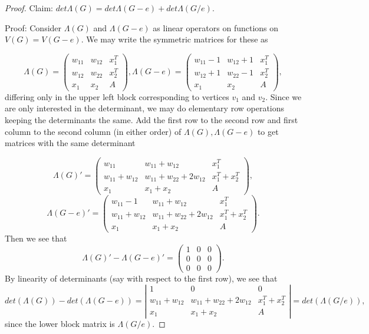 \documentclass{amsart}
\theoremstyle{definition}
\theoremstyle{remark}
\begin{document}
\begin{proof}
Claim:  $det \Lambda(G)=det \Lambda(G-e) + det \Lambda (G/e)$. 

Proof: Consider $\Lambda(G)$ and $\Lambda(G-e)$ as linear operators on functions on $V(G)=V(G-e)$. We may write the symmetric matrices for these as 

$$\Lambda(G)= \left(\begin{array}{ccc} w_{11} & w_{12} & x_1^T \\ w_{12} & w_{22} & x_2^T \\x_1 & x_2 &  A\end{array}\right) ,   \Lambda(G-e) =  \left(\begin{array}{ccc} w_{11}-1 & w_{12}+1 & x_1^T \\ w_{12}+1 & w_{22}-1 & x_2^T \\x_1 & x_2 &A  \end{array}\right) , $$
differing only in the upper left block corresponding to vertices $v_1$ and $v_2$. Since we are only interested in the determinant, we may do elementary row operations keeping the determinants the same. Add the first row to the second row and first column to the second column (in either order) of $\Lambda(G), \Lambda(G-e)$ to get matrices with the same determinant 

$$\Lambda(G)'= \left(\begin{array}{ccc} w_{11} & w_{11}+w_{12} & x_1^T \\w_{11}+w_{12} & w_{11}+w_{22}+2w_{12} & x_1^T+ x_2^T \\x_1 & x_1+x_2 & A \end{array}\right) , $$  $$\Lambda(G-e)' =  \left(\begin{array}{ccc} w_{11}-1 & w_{11}+w_{12} & x_1^T \\ w_{11}+w_{12} & w_{11}+w_{22}+2w_{12} & x_1^T+ x_2^T \\x_1 & x_1+x_2 & A \end{array}\right) .$$
Then we see that $$\Lambda(G)'-\Lambda(G-e)' = 
 \left(\begin{array}{ccc} 1 & 0 & 0 \\ 0 & 0 & 0 \\ 0 & 0 & 0 \end{array}\right).$$
 By linearity of determinants (say with respect to the first row), we see that 
 $$det(\Lambda(G))-det(\Lambda(G-e)) = \left|\begin{array}{ccc} 1 & 0 &  0 \\ w_{11}+w_{12} & w_{11}+w_{22}+2w_{12} & x_1^T+ x_2^T \\ x_1 & x_1+x_2 & A \end{array}\right| = det (\Lambda(G/e)),$$
since the lower block matrix is $\Lambda(G/e)$. 


\end{proof}
\end{document}
